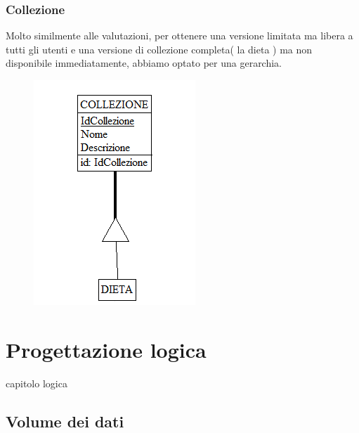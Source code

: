 ﻿\documentclass[a4paper,12pt]{report}
\begin{document}
\subsection{Collezione}
Molto similmente alle valutazioni, per ottenere una versione limitata
ma libera a tutti gli utenti e una versione di collezione completa( la dieta )
ma non disponibile immediatamente, abbiamo optato per una gerarchia.
\begin{figure}[H]
    \centering
    \includegraphics[width=0.5\linewidth]{app_images/collezione-concettuale.png}
\end{figure}
\chapter{Progettazione logica}
capitolo logica
\section{Volume dei dati}
      
\end{document}
